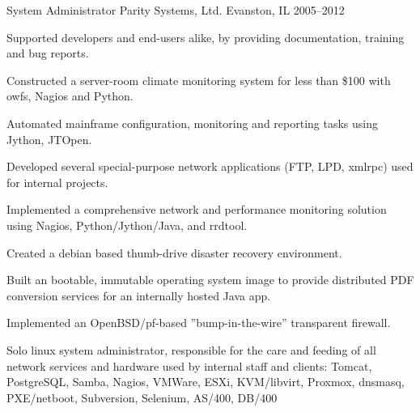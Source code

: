 \begin{cventries}
{\vspace*{3ex} %
}
  \cventry
    {System Administrator} %
    {Parity Systems, Ltd.} %
    {Evanston, IL} %
    {2005--2012} %
    {
      \begin{cvitems} %
        \item {Supported developers and end-users alike, by providing documentation, training and bug reports.}
        \item {Constructed a server-room climate monitoring system for less than \$100 with owfs, Nagios and Python.}
        \item {Automated mainframe configuration, monitoring and reporting tasks using Jython, JTOpen.}
        \item {Developed several special-purpose network applications (FTP, LPD, xmlrpc) used for internal projects.}
        \item {Implemented a comprehensive network and performance monitoring solution using Nagios, Python/Jython/Java, and rrdtool.}
        \item {Created a debian based thumb-drive disaster recovery environment.}
        \item {Built an bootable, immutable operating system image to provide distributed PDF conversion services for an internally hosted Java app.}
        \item {Implemented an OpenBSD/pf-based ”bump-in-the-wire” transparent firewall.}
      \end{cvitems}
    }
    {
      \begin{cventrysummary}
        Solo linux system administrator, responsible for the care and feeding of all network services and hardware used by internal staff and clients:
        Tomcat, PostgreSQL, Samba, Nagios, VMWare, ESXi, KVM/libvirt, Proxmox, dnsmasq, PXE/netboot, Subversion, Selenium, AS/400, DB/400
      \end{cventrysummary}
    }


\end{cventries}
